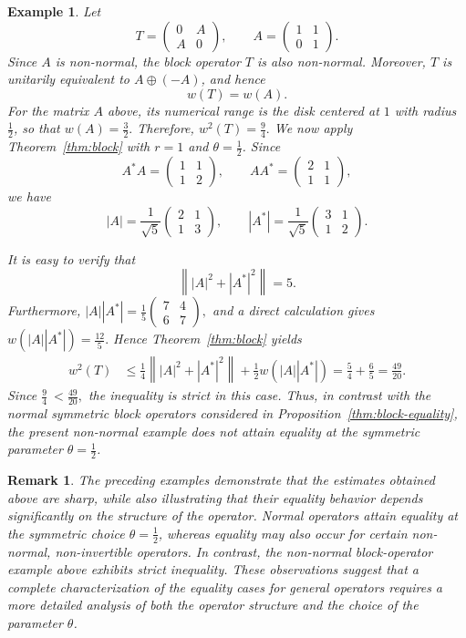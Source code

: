 \documentclass[final,1p,times]{elsarticle}
\newtheorem{rem}[thm]{Remark}
\newtheorem{example}[thm]{Example}
\newcommand{\norm}[1]{\left\lVert #1 \right\rVert}
\begin{document}
\medskip




\begin{example}
Let
\[
T=
\begin{pmatrix}
0&A\\
A&0
\end{pmatrix},
\qquad
A=
\begin{pmatrix}
1&1\\
0&1
\end{pmatrix}.
\]
Since $A$ is non-normal, the block operator $T$ is also non-normal.
Moreover, $T$ is unitarily equivalent to $A\oplus(-A)$, and hence
\[
w(T)=w(A).
\]
For the matrix $A$ above, its numerical range is the disk centered at $1$
with radius $\frac12$, so that $w(A)=\frac32.$ Therefore, $w^2(T)=\frac94.$ We now apply Theorem~\ref{thm:block} with $r=1$ and
$\theta=\frac12$. Since
\[
A^*A=
\begin{pmatrix}
1&1\\
1&2
\end{pmatrix},
\qquad
AA^*=
\begin{pmatrix}
2&1\\
1&1
\end{pmatrix},
\]
we have
\[
|A|
=
\frac1{\sqrt5}
\begin{pmatrix}
2&1\\
1&3
\end{pmatrix},
\qquad
|A^*|
=
\frac1{\sqrt5}
\begin{pmatrix}
3&1\\
1&2
\end{pmatrix}.
\]

It is easy to verify that 
\[
\norm{|A|^2+|A^*|^2}=5.
\]
Furthermore, $|A||A^*|
=
\frac15
\begin{pmatrix}
7&4\\
6&7
\end{pmatrix},$
and a direct calculation gives $w(|A||A^*|)=\frac{12}{5}.$ Hence Theorem~\ref{thm:block} yields
\[
\begin{aligned}
w^2(T)
&\leq
\frac14\norm{|A|^2+|A^*|^2}
+
\frac12 w(|A||A^*|)=
\frac54+\frac65
=
\frac{49}{20}.
\end{aligned}
\]
Since $\frac94\ < \frac{49}{20},$
the inequality is strict in this case. Thus, in contrast with the normal symmetric block operators considered in
Proposition~\ref{thm:block-equality}, the present non-normal example does
not attain equality at the symmetric parameter $\theta=\frac12$.
\end{example}

\begin{rem}
The preceding examples demonstrate that the estimates obtained above are
sharp, while also illustrating that their equality behavior depends
significantly on the structure of the operator. Normal operators attain
equality at the symmetric choice $\theta=\frac12$, whereas equality may also
occur for certain non-normal, non-invertible operators. In contrast, the
non-normal block-operator example above exhibits strict inequality. These
observations suggest that a complete characterization of the equality cases
for general operators requires a more detailed analysis of both the operator
structure and the choice of the parameter $\theta$.
\end{rem}
\end{document}
